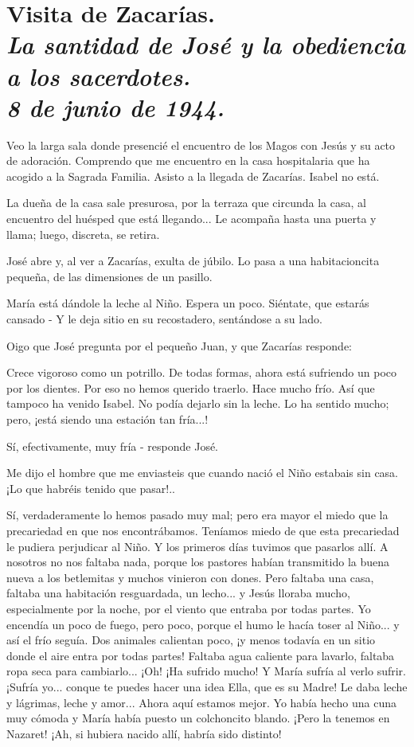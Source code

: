 \documentclass[12pt]{book} %
\begin{document}
\chapter*{Visita de Zacarías. \\ \normalfont\normalsize\textit{La santidad de José y la obediencia a los sacerdotes. \\ 8 de junio de 1944.}}

Veo la larga sala donde presencié el encuentro de los Magos con Jesús y su acto de adoración. Comprendo que me encuentro en la casa hospitalaria que ha acogido a la Sagrada Familia. Asisto a la llegada de Zacarías. Isabel no está. 

La dueña de la casa sale presurosa, por la terraza que circunda la casa, al encuentro del huésped que está llegando... Le acompaña hasta una puerta y llama; luego, discreta, se retira. 

José abre y, al ver a Zacarías, exulta de júbilo. Lo pasa a una habitacioncita pequeña, de las dimensiones de un pasillo. 

María está dándole la leche al Niño. Espera un poco. Siéntate, que estarás cansado - Y le deja sitio en su recostadero, sentándose a su lado. 

Oigo que José pregunta por el pequeño Juan, y que Zacarías responde: 

Crece vigoroso como un potrillo. De todas formas, ahora está sufriendo un poco por los dientes. Por eso no hemos querido traerlo. Hace mucho frío. Así que tampoco ha venido Isabel. No podía dejarlo sin la leche. Lo ha sentido mucho; pero, ¡está siendo una estación tan fría...! 

Sí, efectivamente, muy fría - responde José. 

Me dijo el hombre que me enviasteis que cuando nació el Niño estabais sin casa. ¡Lo que habréis tenido que pasar!.. 

Sí, verdaderamente lo hemos pasado muy mal; pero era mayor el miedo que la precariedad en que nos encontrábamos. Teníamos miedo de que esta precariedad le pudiera perjudicar al Niño. Y los primeros días tuvimos que pasarlos allí. A nosotros no nos faltaba nada, porque los pastores habían transmitido la buena nueva a los betlemitas y muchos vinieron con dones. Pero faltaba una casa, faltaba una habitación resguardada, un lecho... y Jesús lloraba mucho, especialmente por la noche, por el viento que entraba por todas partes. Yo encendía un poco de fuego, pero poco, porque el humo le hacía toser al Niño... y así el frío seguía. Dos animales calientan poco, ¡y menos todavía en un sitio donde el aire entra por todas partes! Faltaba agua caliente para lavarlo, faltaba ropa seca para cambiarlo... ¡Oh! ¡Ha sufrido mucho! Y María sufría al verlo sufrir. ¡Sufría yo... conque te puedes hacer una idea Ella, que es su Madre! Le daba leche y lágrimas, leche y amor... Ahora aquí estamos mejor. Yo había hecho una cuna muy cómoda y María había puesto un colchoncito blando. ¡Pero la tenemos en Nazaret! ¡Ah, si hubiera nacido allí, habría sido distinto! 
\end{document}
